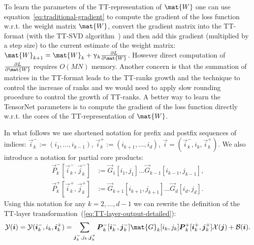 To learn the parameters of the TT-representation of $\mat{W}$ one can use equation~\eqref{eq:traditional-gradient} to compute the gradient of the loss function w.r.t. the weight matrix $\mat{W}$, convert the gradient matrix into the TT-format (with the TT-SVD algorithm~\cite{oseledets2011ttMain}) and then add this gradient (multiplied by a step size) to the current estimate of the weight matrix: $\mat{W}_{k+1} = \mat{W}_{k} + \gamma_k \frac{\partial L}{\partial \mat{W}}$. However direct computation of $\frac{\partial L}{\partial \mat{W}}$ requires $O(MN)$ memory. Another concern is that the summation of matrices in the TT-format leads to the TT-ranks growth and the technique to control the increase of ranks and we would need to apply slow rounding procedure to control the growth of TT-ranks. A better way to learn the TensorNet parameters is to compute the gradient of the loss function directly w.r.t. the cores of the TT-representation of $\mat{W}$.


In what follows we use shortened notation for prefix and postfix sequences of indices: $\vec{i}_k^- := (i_1, \dots, i_{k-1})$, $\vec{i}_k^+ := (i_{k+1}, \dots, i_d)$, $\vec{i} = (\vec{i}_k^-, i_k, \vec{i}_k^+)$. We also introduce a notation for partial core products:
\begin{equation}
\begin{aligned}
\vec{P}_k^-[\vec{i}_k^-, \vec{j}_k^-] &:= \vec{G}_1[i_1, j_1] \dots \vec{G}_{k-1}[i_{k-1}, j_{k-1}], \\
\vec{P}_k^+[\vec{i}_k^+, \vec{j}_k^+] &:= \vec{G}_{k+1}[i_{k+1}, j_{k+1}] \dots \vec{G}_d[i_d, j_d].
\end{aligned}
\end{equation}
Using this notation for any $k = 2, \ldots, d-1$ we can rewrite the definition of the TT-layer transformation~(\ref{eq:TT-layer-output-detailed}):
\begin{equation}
\label{eq:TT-layer-tensor-form}
\tensel{Y}(\vec{i}) = \tensel{Y}(\vec{i}_k^-, i_k, \vec{i}_k^+) =
\sum_{\vec{j}_k^-, j_k, \vec{j}_k^+}  \vec{P}_k^-[\vec{i}_k^-, \vec{j}_k^-] \mat{G}_k[i_k, j_k] \vec{P}_k^+[\vec{i}_k^+, \vec{j}_k^+] \tensel{X}(\vec{j}) + \tensel{B}(\vec{i}).
\end{equation}

